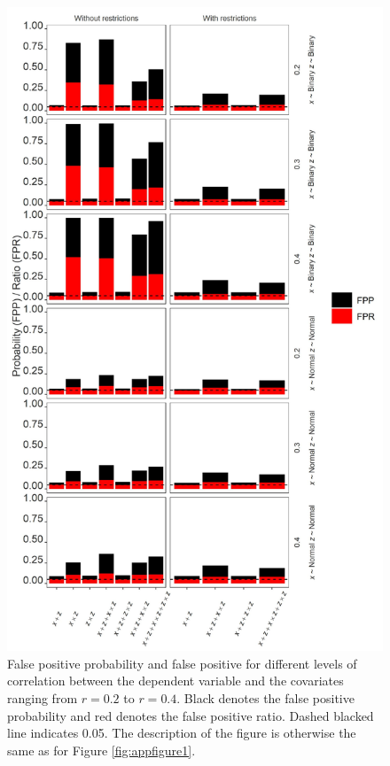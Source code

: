 \begin{landscape}
\begin{figure}[hbt!]
\includegraphics[scale=0.7]{R/Analysis/Result/Figures/Figure2SI.jpeg}
\centering
\caption{False positive probability and false positive for different levels of correlation between the dependent variable and the covariates ranging from  $\textit{r}=0.2$ to  $\textit{r}=0.4$. Black denotes the false positive probability and red denotes the false positive ratio. Dashed blacked line indicates 0.05. The description of the figure is otherwise the same as for Figure \ref{fig:appfigure1}.}
\label{fig:appfigure2}
\end{figure}
\end{landscape}


